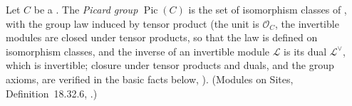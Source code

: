 \begin{definition}
\label{def:pcb-picard-group}
Let \(C\) be a .  The
\emph{Picard group} \(\operatorname{Pic}(C)\) is the set of
isomorphism classes of
, with the group law induced by tensor product (the
unit is \(\mathcal O_C\), the invertible modules are closed under
tensor products, so that the law is defined on isomorphism classes,
and the inverse of an invertible module \(\mathcal L\) is its dual
\(\mathcal L^{\vee}\), which is invertible; closure under tensor
products and duals, and the group axioms, are verified in the basic
facts below, ).  (Modules on Sites,
Definition~18.32.6, .)
\leanok
{}
\end{definition}

